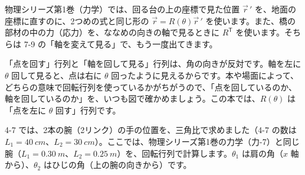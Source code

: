 物理シリーズ第1巻（力学）では、回る台の上の座標で見た位置 $\vec r\,'$ を、地面の座標に直すのに、2つめの式と同じ形の $\vec r=R(\theta)\vec r\,'$ を使います。また、橋の部材の中の力（応力）を、ななめの向きの軸で見るときに $R^{\mathsf T}$ を使います。そちらは 7-9 の「軸を変えて見る」で、もう一度出てきます。
\begin{seikaku}
「点を回す」行列と「軸を回して見る」行列は、角の向きが反対です。軸を左に $\theta$ 回して見ると、点は右に $\theta$ 回ったように見えるからです。本や場面によって、どちらの意味で回転行列を使っているかがちがうので、「点を回しているのか、軸を回しているのか」を、いつも図で確かめましょう。この本では、$R(\theta)$ は「点を左に $\theta$ 回す」行列です。
\end{seikaku}


\label{bk:7-6:ude}4-7 では、2本の腕（2リンク）の手の位置を、三角比で求めました（4-7 の数は $L_1=\qty{40}{cm}$、$L_2=\qty{30}{cm}$）。ここでは、物理シリーズ第1巻の力学（力-7）と同じ腕（$L_1=\qty{0.30}{m}$、$L_2=\qty{0.25}{m}$）を、回転行列で計算します。$\theta_1$ は肩の角（$x$ 軸から）、$\theta_2$ はひじの角（上の腕の向きから）です。

